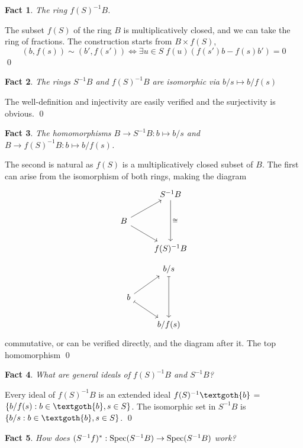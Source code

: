 \documentclass{article}
\newtheorem{theorem}{Fact}[section]
\begin{document}
\begin{theorem}
The ring $f(S)^{-1}B$.
\end{theorem}

\noindent
The subset $f(S)$ of the ring $B$ is multiplicatively closed, and we can take the ring of fractions. The construction starts from $B \times f(S)$,
\[
(b, f(s)) \sim (b', f(s')) \iff \exists u \in S \; f(u)(f(s')b - f(s)b') = 0
\]
\qed

\begin{theorem}
The rings $S^{-1}B$ and $f(S)^{-1}B$ are isomorphic via $b/s \mapsto b/f(s)$
\end{theorem}

\noindent
The well-definition and injectivity are easily verified and the surjectivity is obvious.
\qed

\begin{theorem}
The homomorphisms $B \rightarrow S^{-1}B: b \mapsto b/s$ and $B \rightarrow f(S)^{-1}B: b \mapsto b/f(s)$.
\end{theorem}

\noindent
The second is natural as $f(S)$ is a multiplicatively closed subset of $B$. The first can arise from the isomorphism of both rings, making the diagram
\[
\begin{tikzcd}
  & S^{-1}B \arrow[dd, "\cong"] \\
  B \arrow[ur] \arrow[dr] \\
  & f(S)^{-1}B
\end{tikzcd}
\]
\[
\begin{tikzcd}
  & b/s \arrow[dd, mapsto] \\
  b \arrow[ur] \arrow[dr, mapsto] \\
  & b/f(s)
\end{tikzcd}
\]
commutative, or can be verified directly, and the diagram after it. The top homomorphism 
\qed

\begin{theorem}
What are general ideals of $f(S)^{-1}B$ and $S^{-1}B$?
\end{theorem}

\noindent
Every ideal of $f(S)^{-1}B$ is an extended ideal $f(S)^{-1}\textgoth{b}$ = $\{b/f(s): b\in \textgoth{b}, s \in S\}$. The isomorphic set in $S^{-1}B$ is $\{b/s: b\in \textgoth{b}, s \in S\}$.
\qed


\begin{theorem}
How does $(S^{-1}f)^*: \textnormal{Spec}(S^{-1}B) \rightarrow \text{Spec}(S^{-1}B)$ work? 
\end{theorem}
\end{document}
